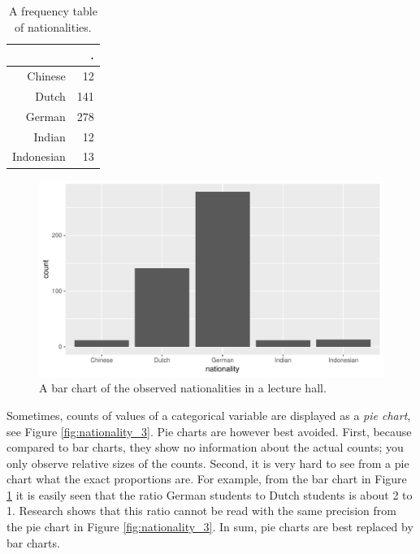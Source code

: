 \documentclass[]{report}\usepackage[]{graphicx}\usepackage[]{color}
\makeatletter
\def\maxwidth{ %
  \ifdim\Gin@nat@width>\linewidth
    \linewidth
  \else
    \Gin@nat@width
  \fi
}
\newenvironment{knitrout}{}{} %
\makeatother
\begin{document}
\begin{table}[ht]
\centering
\caption{A frequency table of nationalities.} 
\label{tab:nationality_1}
\begin{tabular}{rr}
  \hline
 & . \\ 
  \hline
Chinese & 12 \\ 
  Dutch & 141 \\ 
  German & 278 \\ 
  Indian & 12 \\ 
  Indonesian & 13 \\ 
   \hline
\end{tabular}
\end{table}


\begin{knitrout}
\color{fgcolor}\begin{figure}

{\centering \includegraphics[width=\maxwidth]{figure/nationality_2-1} 

}

\caption[A bar chart of the observed nationalities in a lecture hall]{A bar chart of the observed nationalities in a lecture hall.}\label{fig:nationality_2}
\end{figure}


\end{knitrout}

Sometimes, counts of values of a categorical variable are displayed as a \textit{pie chart}, see Figure \ref{fig:nationality_3}. Pie charts are however best avoided. First, because compared to bar charts, they show no information about the actual counts; you only observe relative sizes of the counts. Second, it is very hard to see from a pie chart what the exact proportions are. For example, from the bar chart in Figure \ref{fig:nationality_2} it is easily seen that the ratio German students to Dutch students is about 2 to 1. Research shows that this ratio cannot be read with the same precision from the pie chart in Figure \ref{fig:nationality_3}. In sum, pie charts are best replaced by bar charts.
\end{document}
